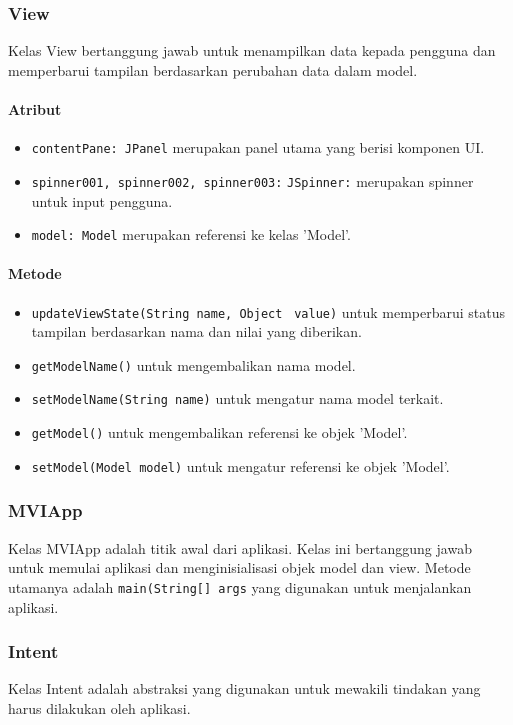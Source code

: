 \documentclass[conference]{IEEEtran}
\begin{document}
\subsubsection{View}
Kelas View bertanggung jawab untuk menampilkan data kepada pengguna dan memperbarui tampilan berdasarkan perubahan data dalam model.
\paragraph{Atribut} 
\begin{itemize}
\item \verb |contentPane: JPanel| merupakan panel utama yang berisi komponen UI.
\item \verb |spinner001, spinner002, spinner003:| \verb |JSpinner:| merupakan spinner untuk input pengguna.
\item \verb |model: Model| merupakan referensi ke kelas 'Model'.
\end{itemize}
\paragraph{Metode} 
\begin{itemize}
\item \verb |updateViewState(String name, Object| \verb | value)| untuk memperbarui status tampilan berdasarkan nama dan nilai yang diberikan.
\item \verb |getModelName()| untuk mengembalikan nama model. 
\item \verb |setModelName(String name)| untuk mengatur nama model terkait.
\item \verb |getModel()| untuk mengembalikan referensi ke objek 'Model'.
\item \verb |setModel(Model model)| untuk mengatur referensi ke objek 'Model'.\\
\end{itemize}

\subsubsection{MVIApp}
Kelas MVIApp adalah titik awal dari aplikasi. Kelas ini bertanggung jawab untuk memulai aplikasi dan menginisialisasi objek model dan view. Metode utamanya adalah \verb |main(String[] args| yang digunakan untuk menjalankan aplikasi.\\

\subsubsection{Intent}
Kelas Intent adalah abstraksi yang digunakan untuk mewakili tindakan yang harus dilakukan oleh aplikasi. \\
\end{document}

